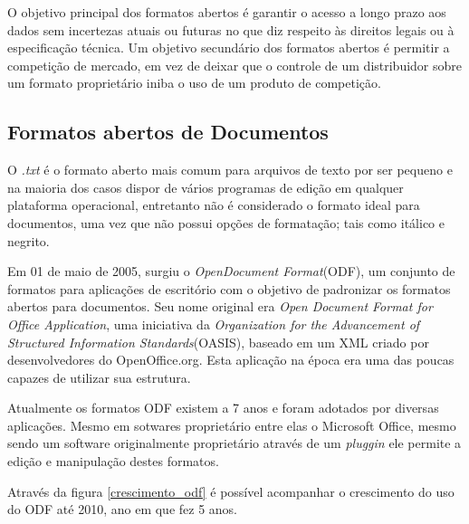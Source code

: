 O objetivo principal dos formatos abertos é garantir o acesso a longo prazo aos dados sem incertezas atuais ou futuras no que diz respeito às direitos legais ou à especificação técnica. Um objetivo secundário dos formatos abertos é permitir a competição de mercado, em vez de deixar que o controle de um distribuidor sobre um formato proprietário iniba o uso de um produto de competição.

\subsection{Formatos abertos de Documentos}
\label{documentos}

O \textit{.txt} é o formato aberto mais comum para arquivos de texto por ser pequeno e na maioria dos casos dispor de vários programas de edição em qualquer plataforma operacional, entretanto não é considerado o formato ideal para documentos, uma vez que não possui opções de formatação; tais como itálico e negrito.

Em 01 de maio de 2005, surgiu o \textit{OpenDocument Format}(ODF), um conjunto de formatos para aplicações de escritório com o objetivo de padronizar os formatos abertos para documentos. Seu nome original era \textit{Open Document Format for Office Application}, uma iniciativa da \textit{Organization for the Advancement of Structured Information Standards}(OASIS), baseado em um XML criado por desenvolvedores do OpenOffice.org. Esta aplicação na época era uma das poucas capazes de utilizar sua estrutura.

Atualmente os formatos ODF existem a 7 anos e foram adotados por diversas aplicações. Mesmo em sotwares proprietário entre elas o Microsoft Office, mesmo sendo um software originalmente proprietário através de um \textit{pluggin} ele permite a edição e manipulação destes formatos.

Através da figura \ref{crescimento_odf} é possível acompanhar o crescimento do uso do ODF até 2010, ano em que fez 5 anos.

